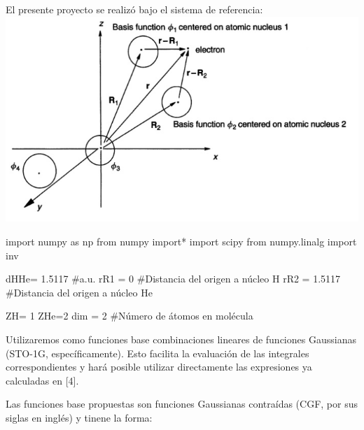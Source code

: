 \documentclass[
  letterpaper,
  DIV=11,
  numbers=noendperiod]{scrreprt}
\newenvironment{Shaded}{\begin{snugshade}}{\end{snugshade}}
\newcommand{\CommentTok}[1]{\textcolor[rgb]{0.37,0.37,0.37}{#1}}
\newcommand{\DecValTok}[1]{\textcolor[rgb]{0.68,0.00,0.00}{#1}}
\newcommand{\FloatTok}[1]{\textcolor[rgb]{0.68,0.00,0.00}{#1}}
\newcommand{\ImportTok}[1]{\textcolor[rgb]{0.00,0.46,0.62}{#1}}
\newcommand{\NormalTok}[1]{\textcolor[rgb]{0.00,0.23,0.31}{#1}}
\newcommand{\OperatorTok}[1]{\textcolor[rgb]{0.37,0.37,0.37}{#1}}
\begin{document}
El presente proyecto se realizó bajo el sistema de referencia:
\includegraphics{./images/im11.png}

\begin{Shaded}
\begin{Highlighting}[]
\ImportTok{import}\NormalTok{ numpy }\ImportTok{as}\NormalTok{ np}
\ImportTok{from}\NormalTok{ numpy }\ImportTok{import}\OperatorTok{*}
\ImportTok{import}\NormalTok{ scipy}
\ImportTok{from}\NormalTok{ numpy.linalg }\ImportTok{import}\NormalTok{ inv}
\end{Highlighting}
\end{Shaded}

\begin{Shaded}
\begin{Highlighting}[]
\NormalTok{dHHe}\OperatorTok{=} \FloatTok{1.5117} \CommentTok{\#a.u.}
\NormalTok{rR1 }\OperatorTok{=} \DecValTok{0} \CommentTok{\#Distancia del origen a núcleo H}
\NormalTok{rR2 }\OperatorTok{=} \FloatTok{1.5117}  \CommentTok{\#Distancia del origen a núcleo He}

\NormalTok{ZH}\OperatorTok{=} \DecValTok{1}
\NormalTok{ZHe}\OperatorTok{=}\DecValTok{2}
\NormalTok{dim }\OperatorTok{=} \DecValTok{2} \CommentTok{\#Número de átomos en molécula}
\end{Highlighting}
\end{Shaded}

Utilizaremos como funciones base combinaciones lineares de funciones
Gaussianas (STO-1G, específicamente). Esto facilita la evaluación de las
integrales correspondientes y hará posible utilizar directamente las
expresiones ya calculadas en {[}4{]}.

Las funciones base propuestas son funciones Gaussianas contraídas (CGF,
por sus siglas en inglés) y tinene la forma:
\end{document}
